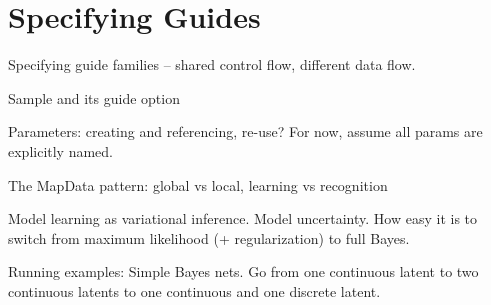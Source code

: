 \section{Specifying Guides}
\label{sec:guideSpec}

Specifying guide families -- shared control flow, different data flow.

Sample and its guide option

Parameters: creating and referencing, re-use? For now, assume all params are explicitly named.

The MapData pattern: global vs local, learning vs recognition

Model learning as variational inference. Model uncertainty. How easy it is to switch from maximum likelihood (+ regularization) to full Bayes.

Running examples: Simple Bayes nets. Go from one continuous latent to two continuous latents to one continuous and one discrete latent.

